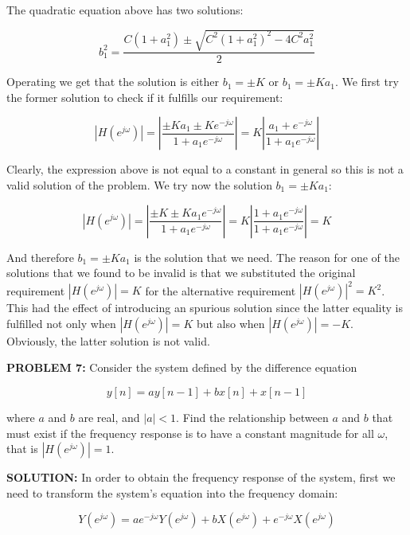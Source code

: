 \documentclass[a4paper,11pt,oneside]{article}
\begin{document}
The quadratic equation above has two solutions:

\[
b_1^2=\frac{C(1+a_1^2)\pm \sqrt{C^2(1+a_1^2)^2-4C^2a_1^2}}{2}
\]

Operating we get that the solution is either $b_1=\pm K$ or $b_1=\pm Ka_1$. We first try the former solution to check if it fulfills our requirement:

\[
|H(e^{j\omega})|=\left|\frac{\pm K a_1\pm Ke^{-j\omega}}{1+a_1e^{-j\omega}}\right|=K\left|\frac{a_1+ e^{-j\omega}}{1+a_1e^{-j\omega}}\right|
\]

Clearly, the expression above is not equal to a constant in general so this is not a valid solution of the problem. We try now the solution $b_1=\pm Ka_1$:


\[
|H(e^{j\omega})|=\left|\frac{\pm K \pm Ka_1e^{-j\omega}}{1+a_1e^{-j\omega}}\right|=K\left|\frac{1+ a_1e^{-j\omega}}{1+a_1e^{-j\omega}}\right|=K
\]

And therefore $b_1=\pm Ka_1$ is the solution that we need. The reason for one of the solutions that we found to be invalid is that we substituted the original requirement $|H(e^{j\omega})|=K$ for the alternative requirement $|H(e^{j\omega})|^2=K^2$. This had the effect of introducing an spurious solution since the latter equality is fulfilled not only when $|H(e^{j\omega})|=K$ but also when $|H(e^{j\omega})|=-K$. Obviously, the latter solution is not valid.

\vspace{1cm}



\textbf{PROBLEM 7:} Consider the system defined by the difference equation 

\[
y[n] = ay[n-1]+bx[n]+x[n-1]
\]

where $a$ and $b$ are real, and $|a|<1$. Find the relationship between $a$ and $b$ that must exist if the frequency response is to have a constant magnitude for all $\omega$, that is $|H(e^{j\omega})|=1$.
\vspace{1cm}



\textbf{SOLUTION:}
In order to obtain the frequency response of the system, first we need to transform the system's equation into the frequency domain:

\[
Y(e^{j\omega})=ae^{-j\omega}Y(e^{j\omega})+bX(e^{j\omega})+e^{-j\omega}X(e^{j\omega})
\]
\end{document}

